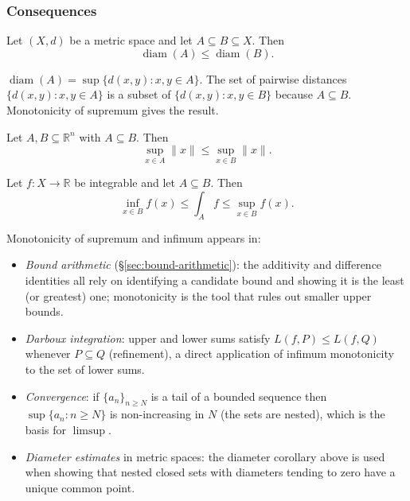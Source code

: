 \subsubsection{Consequences}

\begin{corollary}
\label{cor:diam-monotone}
Let $(X,d)$ be a metric space and let $A \subseteq B \subseteq X$.
Then
\[
\operatorname{diam}(A) \le \operatorname{diam}(B).
\]
\end{corollary}

\begin{remark*}[Why]
$\operatorname{diam}(A) = \sup\{d(x,y) : x,y \in A\}$.
The set of pairwise distances $\{d(x,y) : x,y \in A\}$ is a subset of
$\{d(x,y) : x,y \in B\}$ because $A \subseteq B$.
Monotonicity of supremum gives the result.
\end{remark*}

\begin{corollary}
\label{cor:norm-bounds}
Let $A,B \subseteq \mathbb{R}^n$ with $A \subseteq B$. Then
\[
\sup_{x\in A} \|x\|
\le
\sup_{x\in B} \|x\|.
\]
\end{corollary}

\begin{corollary}
\label{cor:integral-bounds}
Let $f : X \to \mathbb{R}$ be integrable and let $A \subseteq B$.
Then
\[
\inf_{x\in B} f(x)
\le
\int_A f
\le
\sup_{x\in B} f(x).
\]
\end{corollary}

\begin{remark*}
Monotonicity of supremum and infimum appears in:
\begin{itemize}
  \item \emph{Bound arithmetic} (\S\ref{sec:bound-arithmetic}):
        the additivity and difference identities all rely on identifying
        a candidate bound and showing it is the least (or greatest) one;
        monotonicity is the tool that rules out smaller upper bounds.
  \item \emph{Darboux integration}: upper and lower sums satisfy
        $L(f,P) \le L(f,Q)$ whenever $P \subseteq Q$ (refinement), a direct
        application of infimum monotonicity to the set of lower sums.
  \item \emph{Convergence}: if $\{a_n\}_{n \ge N}$ is a tail of a bounded
        sequence then $\sup\{a_n : n \ge N\}$ is non-increasing in $N$
        (the sets are nested), which is the basis for $\limsup$.
  \item \emph{Diameter estimates} in metric spaces: the diameter corollary
        above is used when showing that nested closed sets with diameters
        tending to zero have a unique common point.
\end{itemize}
\end{remark*}
